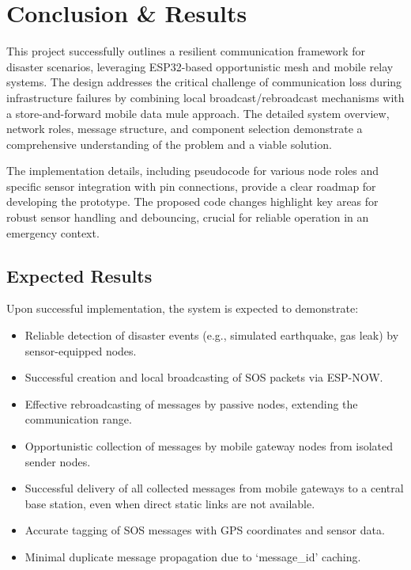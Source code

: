\documentclass[12pt, a4paper]{article}
\begin{document}
\section{Conclusion \& Results} 
This project successfully outlines a resilient communication framework for disaster scenarios, leveraging ESP32-based opportunistic mesh and mobile relay systems. The design addresses the critical challenge of communication loss during infrastructure failures by combining local broadcast/rebroadcast mechanisms with a store-and-forward mobile data mule approach. The detailed system overview, network roles, message structure, and component selection demonstrate a comprehensive understanding of the problem and a viable solution.

The implementation details, including pseudocode for various node roles and specific sensor integration with pin connections, provide a clear roadmap for developing the prototype. The proposed code changes highlight key areas for robust sensor handling and debouncing, crucial for reliable operation in an emergency context.

\subsection{Expected Results}
Upon successful implementation, the system is expected to demonstrate:
\begin{itemize}
    \item Reliable detection of disaster events (e.g., simulated earthquake, gas leak) by sensor-equipped nodes.
    \item Successful creation and local broadcasting of SOS packets via ESP-NOW.
    \item Effective rebroadcasting of messages by passive nodes, extending the communication range.
    \item Opportunistic collection of messages by mobile gateway nodes from isolated sender nodes.
    \item Successful delivery of all collected messages from mobile gateways to a central base station, even when direct static links are not available.
    \item Accurate tagging of SOS messages with GPS coordinates and sensor data.
    \item Minimal duplicate message propagation due to `message\_id' caching.
\end{itemize}
\end{document}
